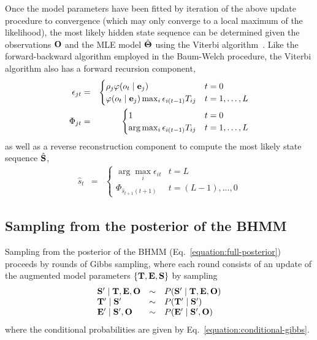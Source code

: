 \documentclass[aps,pre,twocolumn,superscriptaddress,nofootinbib,longbibliography]{revtex4-1}
\newcommand{\bfm}[1]{{\bf #1}}
\begin{document}
{Once the model parameters have been fitted by iteration of the above update procedure to convergence (which may only converge to a local maximum of the likelihood), the most likely hidden state sequence can be determined given the observations $\bfm{O}$ and the MLE model $\hat{\bfm{\Theta}}$ using the Viterbi algorithm~\cite{viterbi:1967:IEEE-trans-info-theory:viterbi-algorithm}.
Like the forward-backward algorithm employed in the Baum-Welch procedure, the Viterbi algorithm also has a forward recursion component,
\begin{eqnarray}
\epsilon_{jt} &=& \begin{cases}
\rho_j \varphi(o_t \mid \bfm{e}_j) & t = 0 \\
\varphi(o_t \mid \bfm{e}_j) \max_{i} \epsilon_{i(t-1)} T_{ij}  & t = 1,\ldots,L
\end{cases} \label{equation:viterbi-forward} \\
\Phi_{jt} &=& \begin{cases}
1 & t = 0 \\
\arg\max_{i} \epsilon_{i(t-1)} T_{ij}  & t = 1,\ldots,L
\end{cases} \nonumber
\end{eqnarray}
as well as a reverse reconstruction component to compute the most likely state sequence $\hat{\bfm{S}}$,
\begin{eqnarray}
\hat{s}_t &=& \begin{cases}
\arg\max_i \epsilon_{it} & t = L\\
\Phi_{\hat{s}_{t+1}(t+1)} & t = (L-1),\ldots,0
\end{cases} 
\end{eqnarray}

\subsection{Sampling from the posterior of the BHMM}
\label{section:algorithms:bhmm-posterior-sampling}

Sampling from the posterior of the BHMM (Eq.~\ref{equation:full-posterior}) proceeds by rounds of Gibbs sampling, where each round consists of an update of the augmented model parameters $\{\bfm{T}, \bfm{E}, \bfm{S}\}$ by sampling
\begin{eqnarray}
\begin{array}{lcl}
\bfm{S}' \mid \bfm{T}, \bfm{E}, \bfm{O} &\sim& P(\bfm{S}' \mid \bfm{T}, \bfm{E}, \bfm{O}) \nonumber \\
\bfm{T}' \mid \bfm{S}' &\sim& P(\bfm{T}' \mid \bfm{S}') \nonumber \\
\bfm{E}' \mid \bfm{S}', \bfm{O} &\sim& P(\bfm{E}' \mid \bfm{S}', \bfm{O}) 
\end{array}
\end{eqnarray}
where the conditional probabilities are given by Eq.~\ref{equation:conditional-gibbs}.  

}
\end{document}
